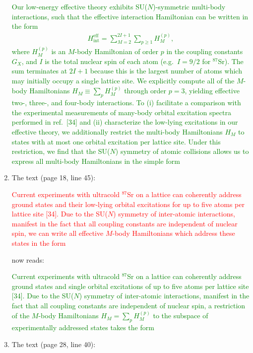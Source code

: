 \documentclass[preprint,showkeys,nofootinbib]{revtex4-1}
\renewcommand{\t}{\text} %
\newcommand{\1}{\mathds{1}}
\newcommand{\red}[1]{\textcolor{red}{#1}}
\newcommand{\green}[1]{\textcolor{green}{#1}}
\newcounter{point}
\begin{document}
\begin{enumerate}[label=(R1.\arabic{point}.\arabic*)]
  \green{Our low-energy effective theory exhibits SU($N$)-symmetric
    multi-body interactions, such that the effective interaction
    Hamiltonian can be written in the form
    \begin{align*}
      H_{\t{int}}^{\t{eff}} = \sum_{M=2}^{2I+1} \sum_{p\ge1} H_M^{(p)},
      \tag{9}
    \end{align*}
    where $H_M^{(p)}$ is an $M$-body Hamiltonian of order $p$ in the
    coupling constants $G_X$, and $I$ is the total nuclear spin of
    each atom (e.g.~$I=9/2$ for ${}^{87}$Sr).  The sum terminates at
    $2I+1$ because this is the largest number of atoms which may
    initially occupy a single lattice site.  We explicitly compute all
    of the $M$-body Hamiltonians $H_M\equiv\sum_p H_M^{(p)}$ through
    order $p=3$, yielding effective two-, three-, and four-body
    interactions.  To (i) facilitate a comparison with the
    experimental measurements of many-body orbital excitation spectra
    performed in ref.~[34] and (ii) characterize the low-lying
    excitations in our effective theory, we additionally restrict the
    multi-body Hamiltonians $H_M$ to states with at most one orbital
    excitation per lattice site.  Under this restriction, we find that
    the SU($N$) symmetry of atomic collisions allows us to express all
    multi-body Hamiltonians in the simple form}


\item The text (page 18, line 45):

  \red{Current experiments with ultracold ${}^{87}$Sr on a lattice can
    coherently address ground states and their low-lying orbital
    excitations for up to five atoms per lattice site [34].  Due to
    the SU($N$) symmetry of inter-atomic interactions, manifest in the
    fact that all coupling constants are independent of nuclear spin,
    we can write all effective $M$-body Hamiltonians which address
    these states in the form}

  now reads:

  \green{Current experiments with ultracold ${}^{87}$Sr on a lattice
    can coherently address ground states and single orbital
    excitations of up to five atoms per lattice site [34].  Due to the
    SU($N$) symmetry of inter-atomic interactions, manifest in the
    fact that all coupling constants are independent of nuclear spin,
    a restriction of the $M$-body Hamiltonians $H_M=\sum_p H_M^{(p)}$
    to the subspace of experimentally addressed states takes the form}


\item The text (page 28, line 40):


\end{enumerate}
\end{document}
